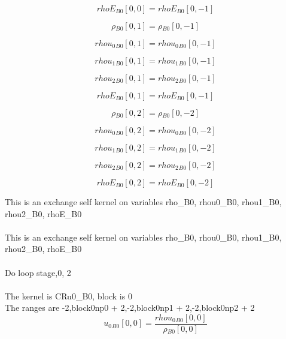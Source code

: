 \documentclass{article}
\begin{document}
\begin{dmath}{rhoE{_{B0}}}[{0,0}] = {rhoE{_{B0}}}[{0,-1}]\end{dmath}

\begin{dmath}{\rho{_{B0}}}[{0,1}] = {\rho{_{B0}}}[{0,-1}]\end{dmath}

\begin{dmath}{rhou_{0}{_{B0}}}[{0,1}] = {rhou_{0}{_{B0}}}[{0,-1}]\end{dmath}

\begin{dmath}{rhou_{1}{_{B0}}}[{0,1}] = {rhou_{1}{_{B0}}}[{0,-1}]\end{dmath}

\begin{dmath}{rhou_{2}{_{B0}}}[{0,1}] = {rhou_{2}{_{B0}}}[{0,-1}]\end{dmath}

\begin{dmath}{rhoE{_{B0}}}[{0,1}] = {rhoE{_{B0}}}[{0,-1}]\end{dmath}

\begin{dmath}{\rho{_{B0}}}[{0,2}] = {\rho{_{B0}}}[{0,-2}]\end{dmath}

\begin{dmath}{rhou_{0}{_{B0}}}[{0,2}] = {rhou_{0}{_{B0}}}[{0,-2}]\end{dmath}

\begin{dmath}{rhou_{1}{_{B0}}}[{0,2}] = {rhou_{1}{_{B0}}}[{0,-2}]\end{dmath}

\begin{dmath}{rhou_{2}{_{B0}}}[{0,2}] = {rhou_{2}{_{B0}}}[{0,-2}]\end{dmath}

\begin{dmath}{rhoE{_{B0}}}[{0,2}] = {rhoE{_{B0}}}[{0,-2}]\end{dmath}

\noindent This is an exchange self kernel on variables rho_B0, rhou0_B0, rhou1_B0, rhou2_B0, rhoE_B0\\\\\noindent This is an exchange self kernel on variables rho_B0, rhou0_B0, rhou1_B0, rhou2_B0, rhoE_B0\\\\\noindent Do loop stage,0, 2\\
\\\noindent The kernel is CRu0_B0, block is 0\\\noindent The ranges are -2,block0np0 + 2,-2,block0np1 + 2,-2,block0np2 + 2\\\begin{dmath}{u_{0}{_{B0}}}[{0,0}] = \frac{{rhou_{0}{_{B0}}}[{0,0}]}{{\rho{_{B0}}}[{0,0}]}\end{dmath}
\end{document}
